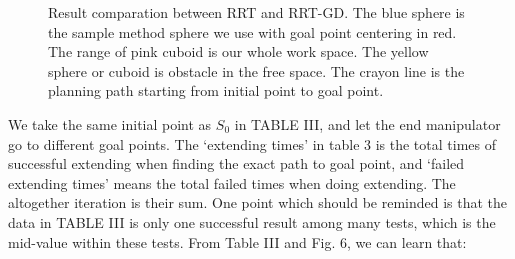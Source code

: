 \documentclass[letterpaper, 10 pt, conference]{ieeeconf}  %
\begin{document}
\begin{figure}[thpb]
      \centering
      
      \caption{Result comparation between RRT and RRT-GD. The blue sphere is the sample method sphere we use with goal point centering in red. The range of pink cuboid is our whole work space. The yellow sphere or cuboid is obstacle in the free space. The crayon line is the planning path starting from initial point to goal point. }
      \label{figurelabe6}
\end{figure}

We take the same initial point as $S_{0}$ in TABLE III, and let the end manipulator go to different goal points. The `extending times' in table 3 is the total times of successful extending when finding the exact path to goal point, and `failed extending times' means the total failed times when doing extending. The altogether iteration is their sum. One point which should be reminded is that the data in TABLE III is only one successful result among many tests, which is the mid-value within these tests. From Table III and Fig. 6, we can learn that:
\end{document}
